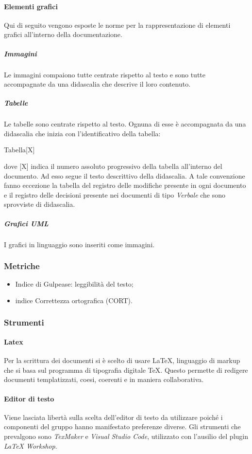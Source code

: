 \paragraph{Elementi grafici}
Qui di seguito vengono esposte le norme per la rappresentazione di elementi grafici all'interno della documentazione.
\subparagraph{Immagini}
Le immagini compaiono tutte centrate rispetto al testo e sono tutte accompagnate da una didascalia che descrive il loro contenuto.
\subparagraph{Tabelle}
Le tabelle sono centrate rispetto al testo. Ognuna di esse è accompagnata da una didascalia che inizia con l'identificativo della tabella:
\begin{center}
    Tabella[X]
\end{center}
dove [X] indica il numero assoluto progressivo della tabella all'interno del documento. Ad esso segue il testo descrittivo della didascalia. A tale convenzione fanno eccezione la tabella del registro delle modifiche presente in ogni documento e il registro delle decisioni presente nei documenti di tipo \textit{Verbale} che sono sprovviste di didascalia.
\subparagraph{Grafici UML}
I grafici in linguaggio  sono inseriti come immagini.

\subsubsection{Metriche}
\begin{itemize}
    \item Indice di Gulpease: leggibilità del testo;
    \item indice Correttezza ortografica (CORT).
\end{itemize}

\subsubsection{Strumenti}
\paragraph{Latex}
Per la scrittura dei documenti si è scelto di usare \LaTeX, linguaggio di markup che si basa sul programma di tipografia digitale \TeX . Questo permette di redigere documenti templatizzati, coesi, coerenti e in maniera collaborativa.
\paragraph{Editor di testo}
Viene lasciata libertà sulla scelta dell'editor di testo da utilizzare poiché i componenti del gruppo hanno manifestato preferenze diverse. Gli strumenti che prevalgono sono \textit{TexMaker} e \textit{Visual Studio Code}, utilizzato con l'ausilio del plugin \textit{LaTeX Workshop}.
